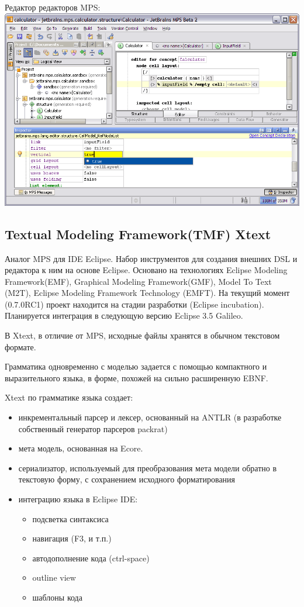 \documentclass[a4paper,12pt]{article}
\begin{document}
\begin{center}
Редактор редакторов MPS:
\includegraphics[scale=0.4]{img/mps.png}
\end{center}

\subsection{Textual Modeling Framework(TMF) Xtext}
Аналог MPS для IDE Eclipse.
Набор инструментов для создания внешних DSL и редактора к ним на основе Eclipse.
Основано на технологиях Eclipse Modeling Framework(EMF), Graphical Modeling
Framework(GMF), Model To Text (M2T), Eclipse Modeling Framework Technology
(EMFT). На текущий момент (0.7.0RC1) проект находится на стадии разработки
(Eclipse incubation). Планируется интеграция в следующую версию Eclipse 3.5
Galileo.

В Xtext, в отличие от MPS, исходные файлы хранятся в обычном текстовом формате.

Грамматика одновременно с моделью задается с помощью компактного и
выразительного языка, в форме, похожей на сильно расширенную EBNF.

Xtext по грамматике языка создает:
\begin{itemize}
  \item инкрементальный парсер и лексер, основанный на ANTLR (в разработке
  собственный генератор парсеров packrat)
  \item мета модель, основанная на Ecore.
  \item сериализатор, используемый для преобразования мета модели обратно в
  текстовую форму, с сохранением исходного форматирования 
  \item интеграцию языка в Eclipse IDE:
  \begin{itemize}
    \item подсветка синтаксиса
    \item навигация (F3, и т.п.)
    \item автодополнение кода (ctrl-space)
    \item outline view
    \item шаблоны кода
  \end{itemize}
\end{itemize}
\end{document}
